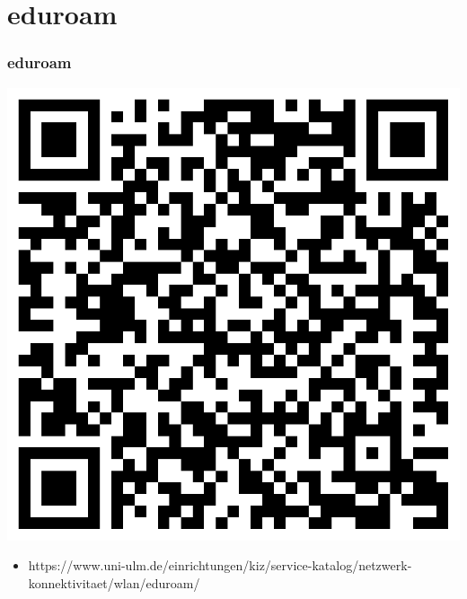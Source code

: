 \documentclass[10pt,a4paper]{beamer}
\begin{document}
\section{eduroam}
\begin{frame}
\frametitle{eduroam}
\begin{center}
\includegraphics[width=0.5\paperwidth]{eduroam.png}
\end{center}
\begin{itemize}
		\item https://www.uni-ulm.de/einrichtungen/kiz/service-katalog/netzwerk-konnektivitaet/wlan/eduroam/
\end{itemize}
\end{frame}
\end{document}
